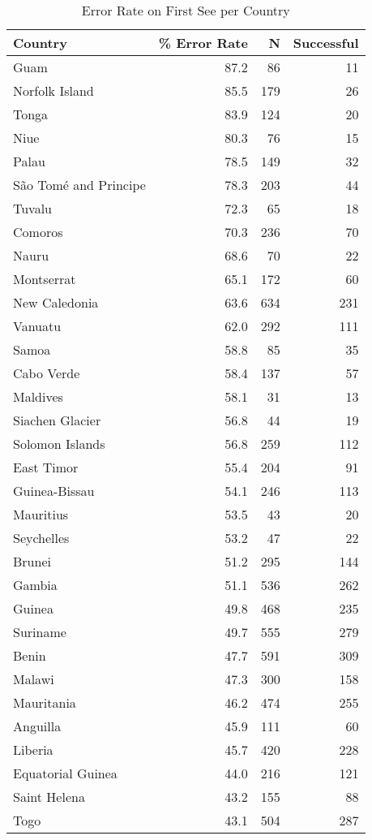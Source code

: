 \begin{table}[htbp]
\centering
\caption{Error Rate on First See per Country}
\label{tab:first-see-error-rates}
\begin{tabular}{lrrr}
\toprule
Country & \% Error Rate & N & Successful \\
\midrule
Guam & 87.2 & 86 & 11 \\
Norfolk Island & 85.5 & 179 & 26 \\
Tonga & 83.9 & 124 & 20 \\
Niue & 80.3 & 76 & 15 \\
Palau & 78.5 & 149 & 32 \\
São Tomé and Principe & 78.3 & 203 & 44 \\
Tuvalu & 72.3 & 65 & 18 \\
Comoros & 70.3 & 236 & 70 \\
Nauru & 68.6 & 70 & 22 \\
Montserrat & 65.1 & 172 & 60 \\
New Caledonia & 63.6 & 634 & 231 \\
Vanuatu & 62.0 & 292 & 111 \\
Samoa & 58.8 & 85 & 35 \\
Cabo Verde & 58.4 & 137 & 57 \\
Maldives & 58.1 & 31 & 13 \\
Siachen Glacier & 56.8 & 44 & 19 \\
Solomon Islands & 56.8 & 259 & 112 \\
East Timor & 55.4 & 204 & 91 \\
Guinea-Bissau & 54.1 & 246 & 113 \\
Mauritius & 53.5 & 43 & 20 \\
Seychelles & 53.2 & 47 & 22 \\
Brunei & 51.2 & 295 & 144 \\
Gambia & 51.1 & 536 & 262 \\
Guinea & 49.8 & 468 & 235 \\
Suriname & 49.7 & 555 & 279 \\
Benin & 47.7 & 591 & 309 \\
Malawi & 47.3 & 300 & 158 \\
Mauritania & 46.2 & 474 & 255 \\
Anguilla & 45.9 & 111 & 60 \\
Liberia & 45.7 & 420 & 228 \\
Equatorial Guinea & 44.0 & 216 & 121 \\
Saint Helena & 43.2 & 155 & 88 \\
Togo & 43.1 & 504 & 287 \\

\end{tabular}
\end{table}
